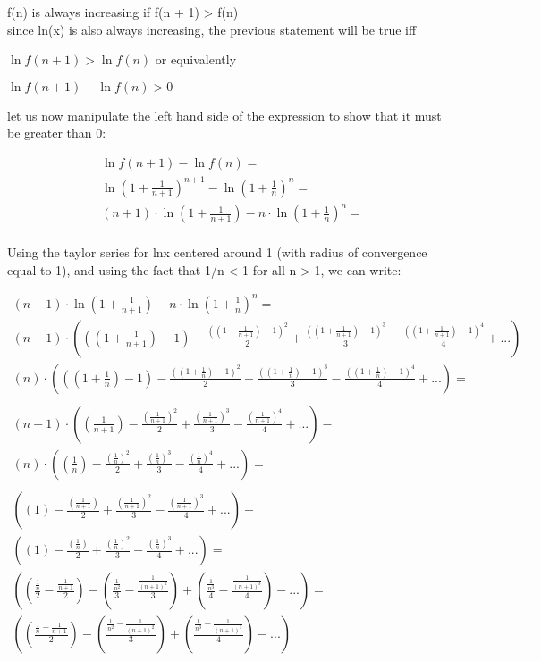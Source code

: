 \documentclass[11pt,fleqn]{article}
\theoremstyle{definition}
\theoremstyle{remark}
\begin{document}
f(n) is always increasing if f(n + 1) > f(n)\\

since ln(x) is also always increasing, the previous statement
will be true iff

$\ln f(n + 1) > \ln f(n)$ 
or equivalently 

$\ln f(n + 1) - \ln f(n) > 0$

let us now manipulate the left hand side of the expression
to show that it must be greater than 0:

\begin{align*}
    \ln f(n + 1) - \ln f(n) =\\ 
    \ln {(1 + \frac{1}{n+ 1})}^{n + 1} - \ln {(1 + \frac{1}{n})}^{n} =\\
    (n + 1) \cdot \ln {(1 + \frac{1}{n+ 1})} - n \cdot \ln {(1 + \frac{1}{n})}^{n}=\\
\end{align*}

Using the taylor series for lnx centered around 1 (with radius of convergence equal to 1),
and using the fact that 1/n < 1 for all n > 1, we can write:

\begin{align*}
    (n + 1) \cdot \ln {(1 + \frac{1}{n+ 1})} - n \cdot \ln {(1 + \frac{1}{n})}^{n}=\\
    (n + 1) \cdot \left(({(1 + \frac{1}{n+1})}-1) - \frac{({(1 + \frac{1}{n+1})}-1)^2}{2} + \frac{({(1 + \frac{1}{n+1})}-1)^3}{3} - \frac{({(1 + \frac{1}{n+1})}-1)^4}{4} + ...\right) -\\ 
    (n) \cdot \left(({(1 + \frac{1}{n})}-1) - \frac{({(1 + \frac{1}{n})}-1)^2}{2} + \frac{({(1 + \frac{1}{n})}-1)^3}{3} - \frac{({(1 + \frac{1}{n})}-1)^4}{4} + ...\right)=\\\\
    (n + 1) \cdot \left(({\frac{1}{n+1}}) - \frac{({\frac{1}{n+1}})^2}{2} + \frac{({\frac{1}{n+1}})^3}{3} - \frac{({\frac{1}{n+1}})^4}{4} + ...\right) -\\ 
    (n) \cdot \left(({\frac{1}{n}}) - \frac{({\frac{1}{n}})^2}{2} + \frac{({\frac{1}{n}})^3}{3} - \frac{({\frac{1}{n}})^4}{4} + ...\right) =\\\\
    \left(({1}) - \frac{({\frac{1}{n+1}})}{2} + \frac{({\frac{1}{n+1}})^2}{3} - \frac{({\frac{1}{n+1}})^3}{4} + ...\right) -\\ 
    \left(({1}) - \frac{({\frac{1}{n}})}{2} + \frac{({\frac{1}{n}})^2}{3} - \frac{({\frac{1}{n}})^3}{4} + ...\right) =\\
    \left(\left(\frac{\frac{1}{n}}{2} - \frac{\frac{1}{n+1}}{2}\right) - \left(\frac{\frac{1}{n^2}}{3} - \frac{\frac{1}{{(n+1)}^2}}{3}\right) + \left(\frac{\frac{1}{n^3}}{4} - \frac{\frac{1}{{(n+1)}^3}}{4}\right) - ...\right) =\\
    \left(\left(\frac{{\frac{1}{n}} - {\frac{1}{n+1}}}{2}\right) - \left(\frac{{\frac{1}{n^2}} - {\frac{1}{{(n+1)}^2}}}{3}\right) + \left(\frac{{\frac{1}{n^3}} - {\frac{1}{{(n+1)}^3}}}{4}\right) - ...\right)
\end{align*}
\end{document}
